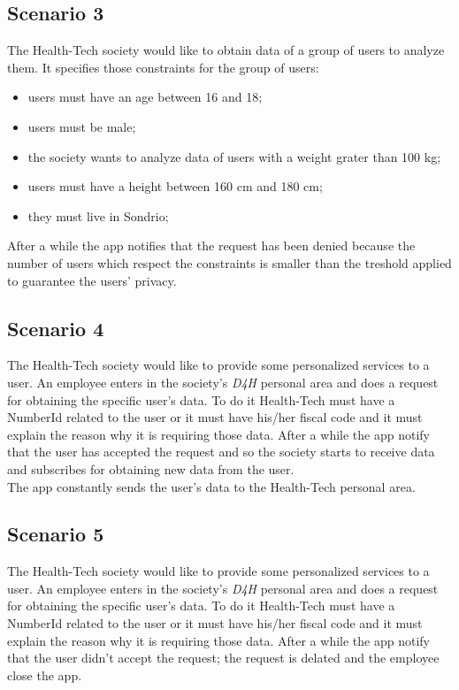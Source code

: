 \subsection{Scenario 3}
The Health-Tech society would like to obtain data of a group of users to analyze them. It specifies those constraints for the group of users:
\begin{itemize}
	\item {users must have an age between 16 and 18;}
	\item {users must be male;}
	\item {the society wants to analyze data of users with a weight grater than 100 kg;}
	\item {users must have a height between 160 cm and 180 cm;}
	\item {they must live in Sondrio;}
\end{itemize}
After a while the app notifies that the request has been denied because the number of users which respect the constraints is smaller than the treshold applied to guarantee the users' privacy. 

\subsection{Scenario 4}
The Health-Tech society would like to provide some personalized services to a user. An employee enters in the society's  \textit{D4H} personal area and does a request for obtaining the specific user's data. 
To do it Health-Tech must have a NumberId related to the user or it must have his/her fiscal code and it must explain the reason why it is requiring those data. After a while the app notify that the user has accepted the request and so the society starts to receive data and subscribes for obtaining new data from the user.\\
The app constantly sends the user's data to the Health-Tech personal area.

\subsection{Scenario 5}
The Health-Tech society would like to provide some personalized services to a user. An employee enters in the society's  \textit{D4H} personal area and does a request for obtaining the specific user's data. 
To do it Health-Tech must have a NumberId related to the user or it must have his/her fiscal code and it must explain the reason why it is requiring those data. After a while the app notify that the user didn't accept the request; the request is delated and the employee close the app.


